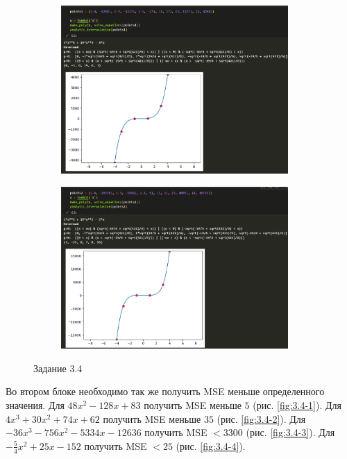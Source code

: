 \documentclass[14pt,a4paper]{extarticle}
\begin{document}
\begin{figure}[ht!]
    \begin{subfigure}{.5\textwidth}
        \centering
        \includegraphics[width=0.95\textwidth]{figures/3.4-1-1.png}
    \end{subfigure}%
    \begin{subfigure}{.5\textwidth}
        \centering
        \includegraphics[width=0.95\textwidth]{figures/3.4-1-2.png}
    \end{subfigure}
    \caption{Задание 3.4}
    \label{fig:3.4block1}
\end{figure}

        Во втором блоке необходимо так же получить MSE меньше
определенного значения. Для $48x^2 - 128x + 83$ получить MSE
меньше $5$ (рис. \ref{fig:3.4-1}). Для $4x^3 + 30x^2 + 74x + 62$
получить MSE меньше $35$ (рис. \ref{fig:3.4-2}). Для $-36 x^3 - 
756 x^2 - 5334 x - 12636$ получить MSE $< 3300$ (рис. \ref{fig:3.4-3}).
Для $- \frac{5}{4} x^2 + 25x - 152$ получить MSE $<25$ (рис. \ref{fig:3.4-4}).
\end{document}
